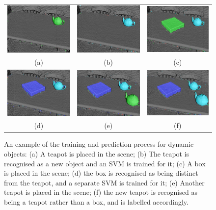 \begin{figure}[h]
  \label{fig:moseg_recognition}
  \centering
  \begin{tabular}{ccc}
    \includegraphics[width=.28\linewidth]{figures/moseg/objects1.png} &
    \includegraphics[width=.28\linewidth]{figures/moseg/objects2.png} &
    \includegraphics[width=.28\linewidth]{figures/moseg/objects3.png} \\ 
    (a) & (b) & (c) \\
    \includegraphics[width=.28\linewidth]{figures/moseg/objects4.png} &
    \includegraphics[width=.28\linewidth]{figures/moseg/objects5.png} &
    \includegraphics[width=.28\linewidth]{figures/moseg/objects6.png} \\ 
    (d) & (e) & (f) \\
  \end{tabular}
  \caption[Motion Segmentation Object Recognition]
  {An example of the training and prediction process for dynamic
    objects:
    (a) A teapot is placed in the scene;
    (b) The teapot is recognised as a new object and an SVM is trained for it;
    (c) A box is placed in the scene; (d) the box is recognised as being
    distinct from the teapot, and a separate SVM is trained for it;
    (e) Another teapot is placed in the scene; (f) the new teapot is recognised
    as being a teapot rather than a box, and is labelled accordingly.}
\end{figure}

